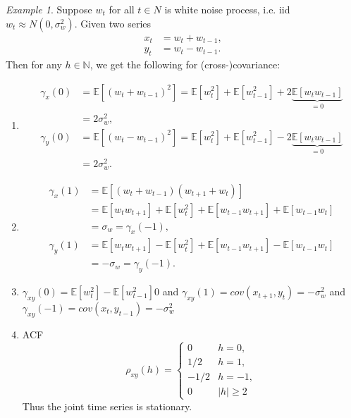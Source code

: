 \documentclass[10pt,titlepage,oneside,openany]{report}
\theoremstyle{remark}
\newtheorem{Example}{Example}[section]
\theoremstyle{plain}
\newcommand{\N}{\mathbb{N}}
\numberwithin{equation}{section}
\renewcommand{\geq}{\geqslant}
\begin{document}
\begin{Example}
	Suppose $w_t$ for all $t\in N$ is white noise process, i.e. iid $w_t \approx N(0, \sigma_w^2)$. Given two series
		\begin{align*}
			x_t &= w_t + w_{t-1},\\
			y_t &= w_t - w_{t-1}.
		\end{align*}
	Then for any $h\in \N$, we get the following for (cross-)covariance:
	\begin{enumerate}
		\item \begin{align*}
					\gamma_x(0) &= \mathds{E}[(w_t + w_{t-1})^2] =  \mathds{E}[w_t^2] + \mathds{E}[w_{t-1}^2] + 2\underbrace{ \mathds{E}[w_t w_{t-1}]}_{=0}\\
					 & = 2\sigma_w^2,
					 \\
					 \gamma_y(0) &= \mathds{E}[(w_t - w_{t-1})^2] =  \mathds{E}[w_t^2] + \mathds{E}[w_{t-1}^2] - 2\underbrace{ \mathds{E}[w_t w_{t-1}]}_{=0}\\
					 & = 2\sigma_w^2.
				\end{align*}
		\item 
			\begin{align*}
				\gamma_x (1) &= \mathds{E}\left[(w_t + w_{t-1}) (w_{t+1} + w_t) \right] \\
						& = \mathds{E}[w_tw_{t+1}] + \mathds{E}[w_t^2] + \mathds{E}[w_{t-1} w_{t+1}] + \mathds{E}[w_{t-1}w_t]\\
						& = \sigma_w = \gamma_x(-1),
						\\
				\gamma_y (1) &=  \mathds{E}[w_tw_{t+1}] - \mathds{E}[w_t^2] + \mathds{E}[w_{t-1} w_{t+1}] - \mathds{E}[w_{t-1}w_t]\\
					&  = - \sigma_w = \gamma_y(-1).
			\end{align*}
		
		\item $\gamma_{xy}(0) =  \mathds{E}[w_t^2]  -  \mathds{E}[w_{t-1}^2]  0$ and $\gamma_{xy} (1) = cov (x_{t+1}, y_t) = -\sigma_w^2$ and $\gamma_{xy} (-1) = cov (x_{t}, y_{t-1}) = -\sigma_w^2$
		
		\item ACF
		\begin{equation}
			\rho_{xy} (h) = 
			\begin{cases}
				0 & h=0,\\
				1/2 & h=1,\\
				-1/2 & h=-1,\\
				0 & |h| \geq 2
			\end{cases}
		\end{equation}
	Thus the joint time series is stationary.
	\end{enumerate}
\end{Example}
\end{document}
